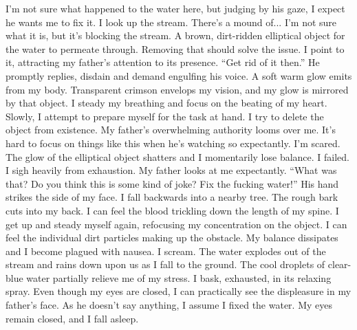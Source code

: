 \documentclass[openany, 12pt]{book}
\newcommand\tab[1][1cm]{\hspace*{#1}}
\begin{document}
\newline
\tab
I’m not sure what happened to the water here, but judging by his gaze, I expect he wants me to fix it. I look up the stream. There’s a mound of... I’m not sure what it is, but it’s blocking the stream. A brown, dirt-ridden elliptical object for the water to permeate through. Removing that should solve the issue. I point to it, attracting my father’s attention to its presence.
\newline
\tab
``Get rid of it then.'' He promptly replies, disdain and demand engulfing his voice. A soft warm glow emits from my body. Transparent crimson envelops my vision, and my glow is mirrored by that object. I steady my breathing and focus on the beating of my heart. Slowly, I attempt to prepare myself for the task at hand. I try to delete the object from existence. My father’s overwhelming authority looms over me. It’s hard to focus on things like this when he’s watching so expectantly. I’m scared. The glow of the elliptical object shatters and I momentarily lose balance. I failed.
\newline
\tab
I sigh heavily from exhaustion. My father looks at me expectantly. ``What was that? Do you think this is some kind of joke? Fix the fucking water!'' His hand strikes the side of my face. I fall backwards into a nearby tree. The rough bark cuts into my back. I can feel the blood trickling down the length of my spine. I get up and steady myself again, refocusing my concentration on the object. I can feel the individual dirt particles making up the obstacle. My balance dissipates and I become plagued with nausea. I scream. The water explodes out of the stream and rains down upon us as I fall to the ground. The cool droplets of clear-blue water partially relieve me of my stress. I bask, exhausted, in its relaxing spray. Even though my eyes are closed, I can practically see the displeasure in my father’s face. As he doesn’t say anything, I assume I fixed the water. My eyes remain closed, and I fall asleep.
\newline
\newline
\tab
\end{document}
